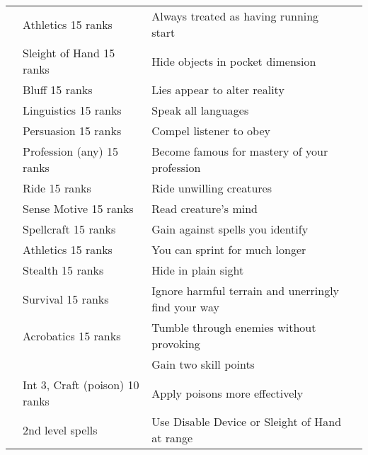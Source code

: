 \begin{longtabuwrapper}
\begin{longtabu}{>{\lcol}p{10em} >{\lcol}p{15em} >{\lcol}X >{\lcol}p{3em}}
         & Athletics 15 ranks & Always treated as having running start &  \\
         & Sleight of Hand 15 ranks & Hide objects in pocket dimension &  \\
         & Bluff 15 ranks & Lies appear to alter reality &  \\
         & Linguistics 15 ranks & Speak all languages &  \\
         & Persuasion 15 ranks & Compel listener to obey &  \\
         & Profession (any) 15 ranks & Become famous for mastery of your profession &  \\
         & Ride 15 ranks & Ride unwilling creatures &  \\
         & Sense Motive 15 ranks & Read creature's mind &  \\
         & Spellcraft 15 ranks & Gain  against spells you identify &  \\
         & Athletics 15 ranks & You can sprint for much longer &  \\
         & Stealth 15 ranks & Hide in plain sight &  \\
         & Survival 15 ranks & Ignore harmful terrain and unerringly find your way &  \\
         & Acrobatics 15 ranks & Tumble through enemies without provoking &  \\
         & \x & Gain two skill points &  \\
         & Int 3, Craft (poison) 10 ranks & Apply poisons more effectively &  \\
         &  2nd level spells & Use Disable Device or Sleight of Hand at range &  \\

\end{longtabu}
\end{longtabuwrapper}
